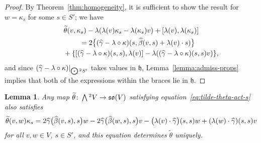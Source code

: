 \documentclass[11pt]{article}
\numberwithin{equation}{section}
\numberwithin{equation}{section}
\newtheorem{Lemma}[Theorem]{Lemma}
\newcommand{\fh}{\mathfrak{h}}
\newcommand{\fso}{\mathfrak{so}}
\newcommand{\betahat}{\widehat{\beta}}
\newcommand{\gammahat}{\widehat{\gamma}}
\newcommand{\thetatilde}{\widetilde{\theta}}
\newcommand{\Wedge}{\mathchoice{{\textstyle\bigwedge}}{\bigwedge}{\bigwedge}{\bigwedge}}	%
\newcommand{\Odot}{\mathchoice{{\textstyle\bigodot}}{\bigodot}{\bigodot}{\bigodot}}
\newcommand{\1}{\mathbbm{1}}
\begin{document}
\begin{proof}
	By Theorem~\ref{thm:homogeneity}, it is sufficient to show the result for $w=\kappa_s$ for some $s\in S'$; we have
	\begin{gather*}
		\thetatilde(v,\kappa_s) - \lambda(\lambda(v)\kappa_s-\lambda(\kappa_s)v) + \comm{\lambda(v)}{\lambda(\kappa_s)}\\
			\qquad= 2\big\{\qty(\gammahat-\lambda\circ\kappa)(s,\betahat(v,s)+\lambda(v)\cdot s)\big\}\\
				\phantom{\qquad= }{} + \qty{\comm{(\gammahat-\lambda\circ\kappa)(s,s)}{\lambda(v)} - \lambda((\gammahat-\lambda\circ\kappa)(s,s)v)},
	\end{gather*}
	and since $(\gammahat-\lambda\circ\kappa)|_{\Odot^2S'}$ takes values in $\fh$, Lemma~\ref{lemma:admiss-props} implies that both of the expressions within the braces lie in $\fh$.
\end{proof}

\begin{Lemma}\label{lemma:tilde-theta-def-2}
	Any map $\thetatilde\colon\Wedge^2 V\to \fso(V)$ satisfying equation~\eqref{eq:tilde-theta-act-s} also satisfies
	\begin{gather*}
		\thetatilde(v,w)\kappa_s
			= 2\gammahat\bigl(\betahat(v,s),s\bigr)w
				- 2\gammahat\bigl(\betahat(w,s),s\bigr)v- \bigl(\lambda(v)\cdot\gammahat\bigr)(s,s)w
				+ \qty(\lambda(w)\cdot\gammahat)(s,s)v\label{eq:tilde-theta-def-2}
	\end{gather*}
	for all $v,w\in V$, $s\in S'$, and this equation determines $\thetatilde$ uniquely.
\end{Lemma}
\end{document}

